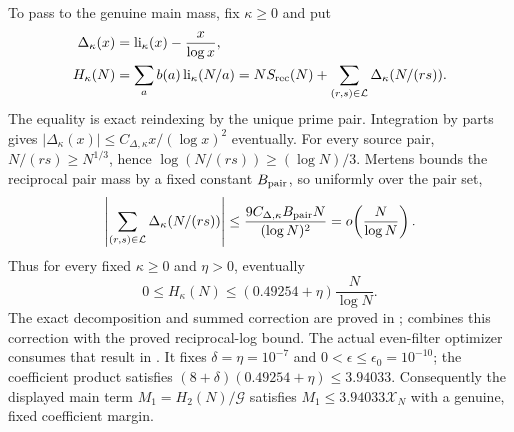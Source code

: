 To pass to the genuine main mass, fix $\kappa\ge0$ and put
\[\begin{aligned}
 \Delta_{\kappa}(x)&=\operatorname{li}_{\kappa}(x)-\frac{x}{\log x},\\
 H_{\kappa}(N)&=\sum_a b(a)\operatorname{li}_{\kappa}(N/a)
       =N S_{\rm rec}(N)+\sum_{(r,s)\in\mathcal L}\Delta_{\kappa}(N/(rs)).
\end{aligned}\]
The equality is exact reindexing by the unique prime pair. Integration by
parts gives $|\Delta_{\kappa}(x)|\le C_{\Delta,\kappa}x/(\log x)^2$ eventually.
For every source pair, $N/(rs)\ge N^{1/3}$, hence
$\log(N/(rs))\ge(\log N)/3$. Mertens bounds the reciprocal pair mass by
a fixed constant $B_{\rm pair}$, so uniformly over the pair set,
\[
 \left|\sum_{(r,s)\in\mathcal L}\Delta_{\kappa}(N/(rs))\right|
 \le\frac{9C_{\Delta,\kappa}B_{\rm pair}N}{(\log N)^2}
 =o\!\left(\frac{N}{\log N}\right).
\]
Thus for every fixed $\kappa\ge0$ and $\eta>0$, eventually
\[
 0\le H_{\kappa}(N)\le(0.49254+\eta)\frac{N}{\log N}.
\]
The exact decomposition and summed correction are proved in
;
combines this correction with the proved reciprocal-log bound.
The actual even-filter optimizer consumes that result in
.
It fixes $\delta=\eta=10^{-7}$ and $0<\epsilon\le\epsilon_0=10^{-10}$;
the coefficient product satisfies
$(8+\delta)(0.49254+\eta)\le3.94033$.
Consequently the displayed main term $M_1=H_2(N)/\mathcal G$ satisfies
$M_1\le3.94033\mathcal X_N$ with a genuine, fixed coefficient margin.

